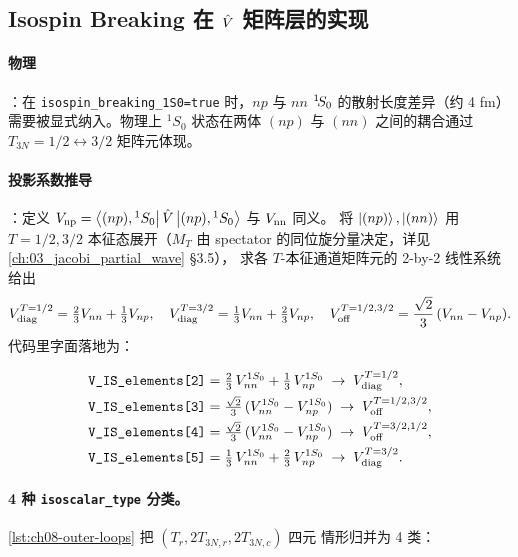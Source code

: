 \subsection{Isospin Breaking 在 \(\hat{V}\) 矩阵层的实现}
\label{subsec:ch08-IB-V}

\paragraph{物理}：在 \texttt{isospin\_breaking\_1S0=true} 时，\(np\) 与 \(nn\)
\({}^{1}\!S_{0}\) 的散射长度差异（约 4 fm）需要被显式纳入。物理上 \({}^1S_0\)
状态在两体 \((np)\) 与 \((nn)\) 之间的耦合通过 \(T_{3N} = 1/2 \leftrightarrow 3/2\)
矩阵元体现。

\paragraph{投影系数推导}：定义
\(V_{\rm np} = \bra{(np), {}^1S_0}\hat{V}\ket{(np), {}^1S_0}\) 与 \(V_{\rm nn}\) 同义。
将 \(\ket{(np)}, \ket{(nn)}\) 用 \(T = 1/2, 3/2\) 本征态展开（\(M_T\) 由 spectator
的同位旋分量决定，详见 \cref{ch:03_jacobi_partial_wave} \S 3.5），
求各 \(T\)-本征通道矩阵元的 2-by-2 线性系统给出
\begin{equation}
\label{eq:ch08-isospin-coeffs}
V^{T=1/2}_{\rm diag} = \tfrac{2}{3} V_{nn} + \tfrac{1}{3} V_{np},
\quad
V^{T=3/2}_{\rm diag} = \tfrac{1}{3} V_{nn} + \tfrac{2}{3} V_{np},
\quad
V^{T=1/2,3/2}_{\rm off} = \frac{\sqrt{2}}{3}\, (V_{nn} - V_{np}).
\end{equation}
代码里字面落地为：

\begin{align*}
\texttt{V\_IS\_elements[2]} &= \tfrac{2}{3}\, V_{nn}^{1S_0} + \tfrac{1}{3}\, V_{np}^{1S_0}
                            \;\to\; V^{T=1/2}_{\rm diag}, \\
\texttt{V\_IS\_elements[3]} &= \tfrac{\sqrt{2}}{3}\, (V_{nn}^{1S_0} - V_{np}^{1S_0})
                            \;\to\; V^{T=1/2,3/2}_{\rm off}, \\
\texttt{V\_IS\_elements[4]} &= \tfrac{\sqrt{2}}{3}\, (V_{nn}^{1S_0} - V_{np}^{1S_0})
                            \;\to\; V^{T=3/2,1/2}_{\rm off}, \\
\texttt{V\_IS\_elements[5]} &= \tfrac{1}{3}\, V_{nn}^{1S_0} + \tfrac{2}{3}\, V_{np}^{1S_0}
                            \;\to\; V^{T=3/2}_{\rm diag}.
\end{align*}

\paragraph{4 种 \texttt{isoscalar\_type} 分类。}
\cref{lst:ch08-outer-loops} 把 \((T_r, 2T_{3N,r}, 2T_{3N,c})\) 四元
情形归并为 4 类：

